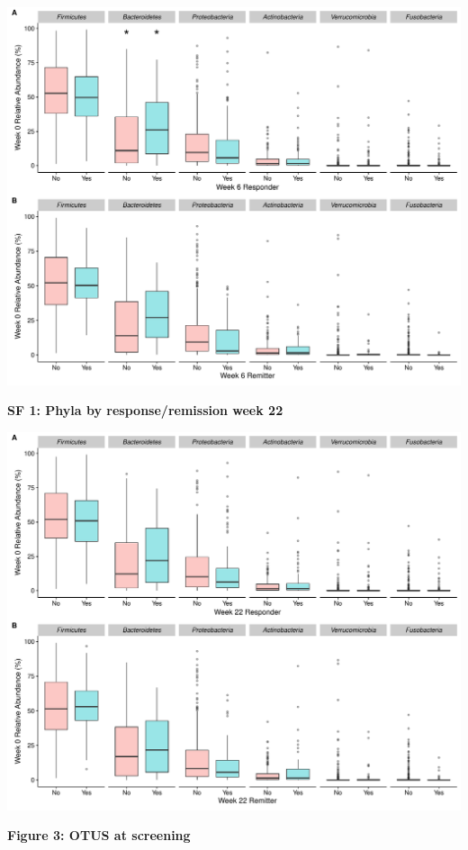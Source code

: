 \documentclass[11pt,]{article}
\begin{document}
\includegraphics{figures/Figure2_wk6phyla.pdf}

\newpage

\textbf{SF 1: Phyla by response/remission week 22}

\includegraphics{figures/SF1_phylaWK22.pdf}

\newpage

\textbf{Figure 3: OTUS at screening}
\end{document}
